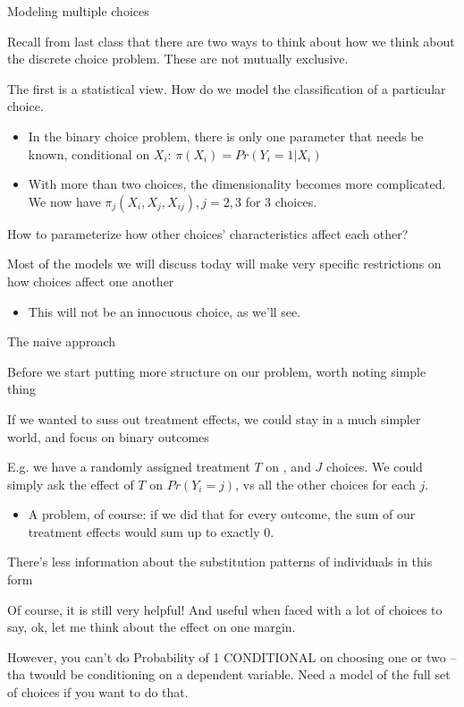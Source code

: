 \documentclass[notes,11pt, aspectratio=169]{beamer}
\newenvironment{wideitemize}{\itemize\addtolength{\itemsep}{10pt}}{\enditemize}
\begin{document}
\begin{frame}{Modeling multiple choices}
    \begin{wideitemize}
    \item Recall from last class that there are two ways to think
      about how we think about the discrete choice problem. These are not
      mutually exclusive.
    \item The first is a statistical view. How do we model the
      classification of a particular choice.
      \begin{itemize}
      \item In the binary choice problem, there is only one parameter
        that needs be known, conditional on $X_{i}$: 
        $\pi(X_{i}) = Pr(Y_{i} = 1 |X _{i})$
      \item With more than two choices, the dimensionality becomes
        more complicated.  We now have
        $\pi_{j}(X_{i}, X_{j}, X_{ij}), j=2,3$ for 3 choices. 
      \end{itemize}
    \item How to parameterize how other choices' characteristics
      affect each other?
    \item Most of the models we will discuss today will
      make very specific restrictions on how choices affect one
      another
      \begin{itemize}
      \item This will not be an innocuous choice, as we'll see.
      \end{itemize}
  \end{wideitemize}
\end{frame}


\begin{frame}{The naive approach}
  \begin{wideitemize}
  \item Before we start putting more structure on our problem, worth
    noting simple thing
  \item If we wanted to suss out treatment effects, we could stay in a
    much simpler world, and focus on binary outcomes
  \item   E.g. we have a randomly assigned treatment $T$ on , and $J$
  choices. We could simply ask the effect of $T$ on $Pr(Y_{i} = j)$, vs all the other choices
  for each $j$.
  \begin{itemize}
  \item A problem, of course: if we did that for every outcome, the
    sum of our treatment effects would sum up to exactly 0.
  \end{itemize}
\item   There's less information about the substitution
  patterns of individuals in this form
\item   Of course, it is still very helpful! And useful when faced with a
  lot of choices to say, ok, let me think about the effect on one
  margin.
\item   However, you can't do Probability of 1 CONDITIONAL on choosing one
  or two -- tha twould be conditioning on a dependent variable. Need a
  model of the full set of choices if you want to do that.
  \end{wideitemize}
\end{frame}
\end{document}
